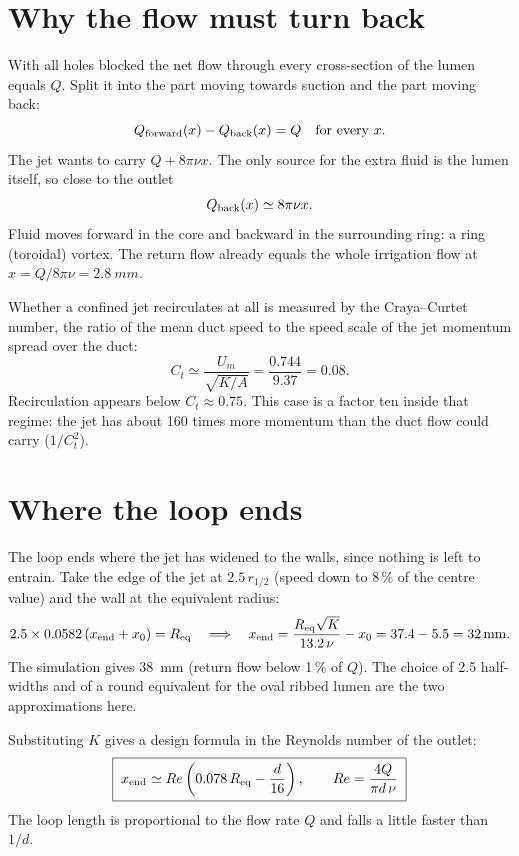 \documentclass[10pt,a4paper]{article}
\begin{document}
\section{Why the flow must turn back}
With all holes blocked the net flow through every cross-section of the lumen equals $Q$. Split it into
the part moving towards suction and the part moving back:
\begin{equation}
Q_{\rm forward}(x)-Q_{\rm back}(x)=Q\quad\text{for every }x .
\end{equation}
The jet wants to carry $Q+8\pi\nu x$. The only source for the extra fluid is the lumen itself, so close
to the outlet
\begin{equation}
Q_{\rm back}(x)\simeq 8\pi\nu x .\label{eq:back}
\end{equation}
Fluid moves forward in the core and backward in the surrounding ring: a ring (toroidal) vortex.
The return flow already equals the whole irrigation flow at $x=Q/8\pi\nu=\SI{2.8}{mm}$.

Whether a confined jet recirculates at all is measured by the Craya--Curtet number, the ratio of the mean
duct speed to the speed scale of the jet momentum spread over the duct:
\begin{equation}
C_t\simeq\frac{U_m}{\sqrt{K/A}}=\frac{0.744}{9.37}=0.08 .
\end{equation}
Recirculation appears below $C_t\approx0.75$. This case is a factor ten inside that regime: the jet has
about 160 times more momentum than the duct flow could carry ($1/C_t^2$).

\section{Where the loop ends}
The loop ends where the jet has widened to the walls, since nothing is left to entrain. Take the edge of
the jet at $2.5\,r_{1/2}$ (speed down to 8\,\% of the centre value) and the wall at the equivalent radius:
\begin{equation}
2.5\times0.0582\,(x_{\rm end}+x_0)=R_{\rm eq}\quad\Longrightarrow\quad
x_{\rm end}=\frac{R_{\rm eq}\sqrt K}{13.2\,\nu}-x_0=37.4-5.5=\SI{32}{mm}.\label{eq:xend}
\end{equation}
The simulation gives \SI{38}{mm} (return flow below 1\,\% of $Q$). The choice of 2.5 half-widths and of a
round equivalent for the oval ribbed lumen are the two approximations here.

Substituting $K$ gives a design formula in the Reynolds number of the outlet:
\begin{equation}
\boxed{\;x_{\rm end}\simeq Re\left(0.078\,R_{\rm eq}-\frac{d}{16}\right),\qquad Re=\frac{4Q}{\pi d\,\nu}\;}
\label{eq:design}
\end{equation}
The loop length is proportional to the flow rate $Q$ and falls a little faster than $1/d$.
\end{document}
